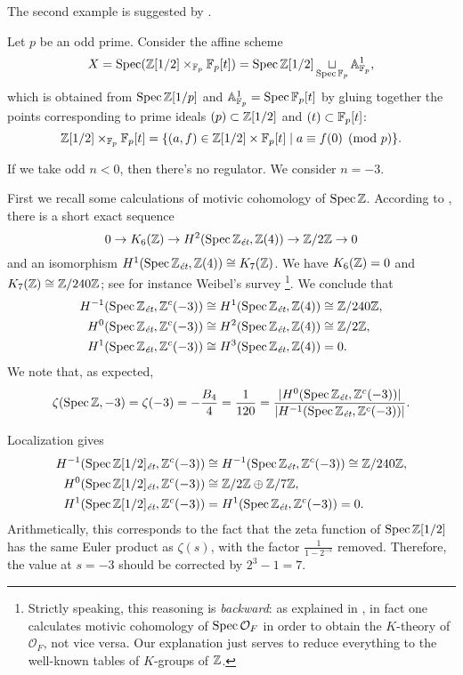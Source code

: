\documentclass[draft]{article}
\numberwithin{equation}{section}
\begin{document}
The second example is suggested by \cite[\S 7]{Jordan-Poonen-2020}.

\begin{example}
  Let $p$ be an odd prime. Consider the affine scheme
  \[ X = \Spec (\ZZ [1/2] \times_{\FF_p} \FF_p [t]) =
    \Spec \ZZ [1/2] \mathop{\sqcup}_{\Spec \FF_p} \AA^1_{\FF_p}, \]
  which is obtained from $\Spec \ZZ [1/p]$ and $\AA^1_{\FF_p} = \Spec \FF_p [t]$ by
  gluing together the points corresponding to prime ideals
  $(p) \subset \ZZ [1/2]$ and $(t) \subset \FF_p [t]$:
  \[ \ZZ [1/2] \times_{\FF_p} \FF_p [t] =
    \{ (a,f) \in \ZZ [1/2] \times \FF_p [t] \mid a \equiv f (0) \pmod{p} \}. \]

  If we take odd $n < 0$, then there's no regulator. We consider $n = -3$.

  First we recall some calculations of motivic cohomology of $\Spec \ZZ$.
  According to \cite[Proposition~2.1]{Kolster-Sands-2008}, there is a short
  exact sequence
  $$0 \to K_6 (\ZZ) \to H^2 (\Spec \ZZ_\et, \ZZ (4)) \to \ZZ/2\ZZ \to 0$$
  and an isomorphism
  $H^1 (\Spec \ZZ_\et, \ZZ (4)) \cong K_7 (\ZZ)$.
  We have $K_6 (\ZZ) = 0$ and $K_7 (\ZZ) \cong \ZZ/240\ZZ$;
  see for instance Weibel's survey \cite{Weibel-2005}\footnote{Strictly
    speaking, this reasoning is \emph{backward}: as explained in
    \cite{Weibel-2005}, in fact one calculates motivic cohomology of
    $\Spec \mathcal{O}_F$ in order to obtain the $K$-theory of $\mathcal{O}_F$,
    not vice versa. Our explanation just serves to reduce everything to the
    well-known tables of $K$-groups of $\ZZ$.}.  We conclude that
  \begin{align*}
    H^{-1} (\Spec \ZZ_\et, \ZZ^c (-3)) & \cong H^1 (\Spec \ZZ_\et, \ZZ (4)) \cong \ZZ/240\ZZ, \\
    H^0 (\Spec \ZZ_\et, \ZZ^c (-3)) & \cong H^2 (\Spec \ZZ_\et, \ZZ (4)) \cong \ZZ/2\ZZ, \\
    H^1 (\Spec \ZZ_\et, \ZZ^c (-3)) & \cong H^3 (\Spec \ZZ_\et, \ZZ (4)) = 0.
  \end{align*}
  We note that, as expected,
  \[ \zeta (\Spec \ZZ, -3) = \zeta (-3) = -\frac{B_4}{4} = \frac{1}{120} =
    \frac{|H^0 (\Spec \ZZ_\et, \ZZ^c (-3))|}{|H^{-1} (\Spec \ZZ_\et, \ZZ^c (-3))|}. \]

  Localization gives
  \begin{align*}
    H^{-1} (\Spec \ZZ [1/2]_\et, \ZZ^c (-3)) & \cong H^{-1} (\Spec \ZZ_\et, \ZZ^c (-3)) \cong \ZZ/240\ZZ, \\
    H^0 (\Spec \ZZ [1/2]_\et, \ZZ^c (-3)) & \cong \ZZ/2\ZZ \oplus \ZZ/7\ZZ, \\
    H^1 (\Spec \ZZ [1/2]_\et, \ZZ^c (-3)) & = H^1 (\Spec \ZZ_\et, \ZZ^c (-3)) = 0.
  \end{align*}
  Arithmetically, this corresponds to the fact that the zeta function of
  $\Spec \ZZ [1/2]$ has the same Euler product as $\zeta (s)$, with the factor
  $\frac{1}{1-2^{-s}}$ removed. Therefore, the value at $s = -3$ should be
  corrected by $2^3 - 1 = 7$.


\end{example}
\end{document}

